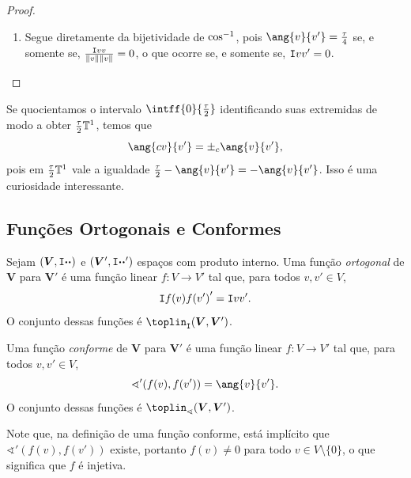 \begin{proof}
\begin{enumerate}
	\item Segue diretamente da bijetividade de $\cos^{-1}$, pois $\ang{v}{v'} = \frac{\tau}{4}$ se, e somente se, $\frac{\mathtt I{v}{v}}{\left\Vert{v}\right\Vert\left\Vert{v}\right\Vert}=0$, o que ocorre se, e somente se, $\mathtt I{v}{v'}=0$. \qedhere
\end{enumerate}
\end{proof}

Se quocientamos o intervalo $\intff{0}{\frac{\tau}{2}}$ identificando suas extremidas de modo a obter $\frac{\tau}{2}\mathbb{T}^1$, temos que
	\begin{equation*}
	\ang{cv}{v'} = \pm_c\ang{v}{v'},
	\end{equation*}
pois em $\frac{\tau}{2}\mathbb{T}^1$ vale a igualdade $\frac{\tau}{2} - \ang{v}{v'} = - \ang{v}{v'}$. Isso é uma curiosidade interessante.







\subsection{Funções Ortogonais e Conformes}

\begin{defi}
Sejam $(\bm V,\mathtt I{\bm{\cdot}}{\bm{\cdot}})$ e $(\bm V',\mathtt I{\bm{\cdot}}{\bm{\cdot}}')$ espaços com produto interno. Uma função \emph{ortogonal} de $\bm V$ para $\bm V'$ é uma função linear $f\colon V \to V'$ tal que, para todos $v,v' \in V$,
	\begin{equation*}
	\mathtt I{f(v)}{f(v')}' = \mathtt I{v}{v'}.
	\end{equation*}
O conjunto dessas funções é $\toplin_{\inte{}{}}(\bm V,\bm V')$.

Uma função \emph{conforme} de $\bm V$ para $\bm V'$ é uma função linear $f\colon V \to V'$ tal que, para todos $v,v' \in V$,
	\begin{equation*}
	\sphericalangle'(f(v),f(v')) = \ang{v}{v'}.
	\end{equation*}
O conjunto dessas funções é $\toplin_{\sphericalangle}(\bm V,\bm V')$.
\end{defi}

Note que, na definição de uma função conforme, está implícito que $\sphericalangle'(f(v),f(v'))$ existe, portanto $f(v) \neq 0$ para todo $v \in V \setminus \{0\}$, o que significa que $f$ é injetiva.

